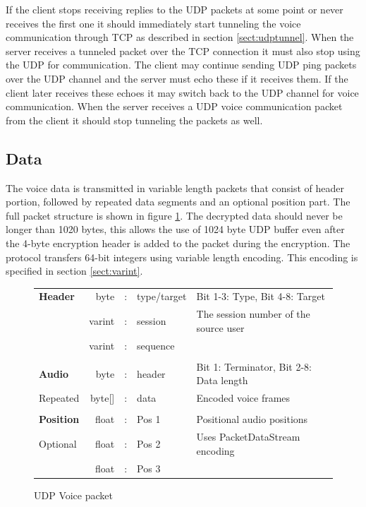 \documentclass[11pt]{article} %
\begin{document}
If the client stops receiving replies to the UDP packets at some point or never receives the first one it should immediately start tunneling the voice communication through TCP as described in section \ref{sect:udptunnel}. When the server receives a tunneled packet over the TCP connection it must also stop using the UDP for communication. The client may continue sending UDP ping packets over the UDP channel and the server must echo these if it receives them. If the client later receives these echoes it may switch back to the UDP channel for voice communication. When the server receives a UDP voice communication packet from the client it should stop tunneling the packets as well.

\subsection{Data}

The voice data is transmitted in variable length packets that consist of header portion, followed by repeated data segments and an optional position part. The full packet structure is shown in figure \ref{fig:udpvoice}. The decrypted data should never be longer than 1020 bytes, this allows the use of 1024 byte UDP buffer even after the 4-byte encryption header is added to the packet during the encryption. The protocol transfers 64-bit integers using variable length encoding. This encoding is specified in section \ref{sect:varint}.

\begin{figure}[htp]\begin{center}\begin{tabular}{l|rcl|p{}}

\cline{2-4}
\textbf{Header} & byte &:& type/target & Bit 1-3: Type, Bit 4-8: Target \\
				\cline{2-4}
				& varint &:& session & The session number of the source user \\
				\cline{2-4}
				& varint &:& sequence & \\
				\cline{2-4}
\multicolumn{5}{c}{} \\
				\cline{2-4}
\textbf{Audio}	& byte &:& header & Bit 1: Terminator, Bit 2-8: Data length \\
				\cline{2-4}
Repeated		& byte[] &:& data & Encoded voice frames\\
				\cline{2-4}
\multicolumn{5}{c}{} \\
				\cline{2-4}

\textbf{Position} & float &:& Pos 1 & Positional audio positions \\
				\cline{2-4}
Optional		& float &:& Pos 2 & Uses PacketDataStream encoding \\
				\cline{2-4}
				& float &:& Pos 3 & \\
				\cline{2-4}

\end{tabular}
\caption{UDP Voice packet}\label{fig:udpvoice}
\end{center}\end{figure}
\end{document}
